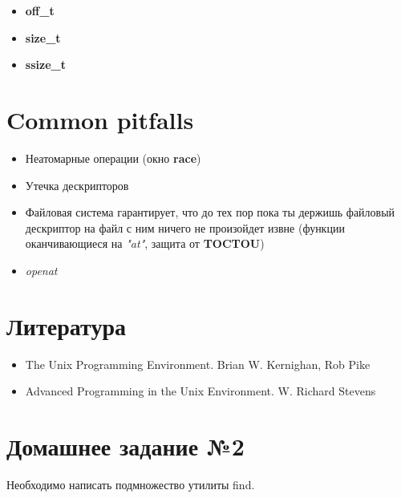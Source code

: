 \documentclass[../../lectures.tex]{subfiles}
\begin{document}
\begin{itemize}
    \item \textbf{off\_t}
    \item \textbf{size\_t}
    \item \textbf{ssize\_t}
\end{itemize}


\section{Common pitfalls}
\begin{itemize}
    \item Неатомарные операции (окно \textbf{race})
    \item Утечка дескрипторов
    \item Файловая система гарантирует, что до тех пор пока 
          ты держишь файловый дескриптор на файл с ним ничего 
          не произойдет извне (функции оканчивающиеся на \emph{"at"}, 
          защита от \textbf{TOCTOU})
    \item \emph{openat}
\end{itemize}

\section{Литература}
\begin{itemize}
    \item The Unix Programming Environment. Brian W. Kernighan, Rob Pike
    \item Advanced Programming in the Unix Environment. W. Richard Stevens
\end{itemize}

\section{Домашнее задание №2}
Необходимо написать подмножество утилиты find.
\end{document}
